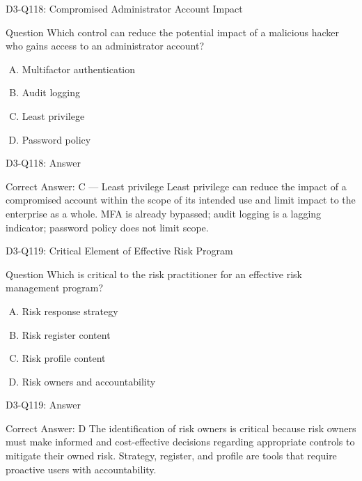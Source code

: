 \documentclass{beamer}
\begin{document}
	\begin{frame}{D3-Q118: Compromised Administrator Account Impact}
		\begin{block}{Question}
			Which control can reduce the potential impact of a malicious hacker who gains access to an administrator account?
		\end{block}
		\begin{enumerate}[(A)]
			\item Multifactor authentication
			\item Audit logging
			\item Least privilege
			\item Password policy
		\end{enumerate}
	\end{frame}
	\begin{frame}{D3-Q118: Answer}
		\begin{block}{Correct Answer: C --- Least privilege}
			Least privilege can reduce the impact of a compromised account within the scope of its intended use and limit impact to the enterprise as a whole. MFA is already bypassed; audit logging is a lagging indicator; password policy does not limit scope.
		\end{block}
	\end{frame}
	
	\begin{frame}{D3-Q119: Critical Element of Effective Risk Program}
		\begin{block}{Question}
			Which is critical to the risk practitioner for an effective risk management program?
		\end{block}
		\begin{enumerate}[(A)]
			\item Risk response strategy
			\item Risk register content
			\item Risk profile content
			\item Risk owners and accountability
		\end{enumerate}
	\end{frame}
	\begin{frame}{D3-Q119: Answer}
		\begin{block}{Correct Answer: D}
			The identification of risk owners is critical because risk owners must make informed and cost-effective decisions regarding appropriate controls to mitigate their owned risk. Strategy, register, and profile are tools that require proactive users with accountability.
		\end{block}
	\end{frame}
	
\end{document}
